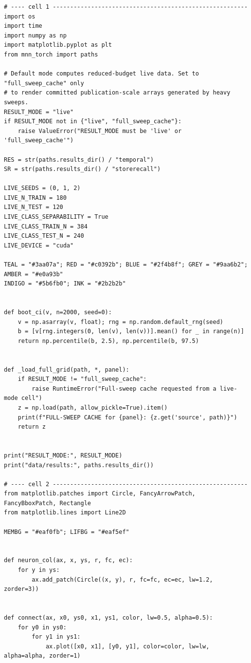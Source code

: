 \begin{lstlisting}[caption={experiments/temporal\_storerecall.ipynb},label={lst:mnn-nb-temporal-storerecall}]
# ---- cell 1 --------------------------------------------------------
import os
import time
import numpy as np
import matplotlib.pyplot as plt
from mnn_torch import paths

# Default mode computes reduced-budget live data. Set to "full_sweep_cache" only
# to render committed publication-scale arrays generated by heavy sweeps.
RESULT_MODE = "live"
if RESULT_MODE not in {"live", "full_sweep_cache"}:
    raise ValueError("RESULT_MODE must be 'live' or 'full_sweep_cache'")

RES = str(paths.results_dir() / "temporal")
SR = str(paths.results_dir() / "storerecall")

LIVE_SEEDS = (0, 1, 2)
LIVE_N_TRAIN = 180
LIVE_N_TEST = 120
LIVE_CLASS_SEPARABILITY = True
LIVE_CLASS_TRAIN_N = 384
LIVE_CLASS_TEST_N = 240
LIVE_DEVICE = "cuda"

TEAL = "#3aa07a"; RED = "#c0392b"; BLUE = "#2f4b8f"; GREY = "#9aa6b2"; AMBER = "#e0a93b"
INDIGO = "#5b6fb0"; INK = "#2b2b2b"


def boot_ci(v, n=2000, seed=0):
    v = np.asarray(v, float); rng = np.random.default_rng(seed)
    b = [v[rng.integers(0, len(v), len(v))].mean() for _ in range(n)]
    return np.percentile(b, 2.5), np.percentile(b, 97.5)


def _load_full_grid(path, *, panel):
    if RESULT_MODE != "full_sweep_cache":
        raise RuntimeError("Full-sweep cache requested from a live-mode cell")
    z = np.load(path, allow_pickle=True).item()
    print(f"FULL-SWEEP CACHE for {panel}: {z.get('source', path)}")
    return z


print("RESULT_MODE:", RESULT_MODE)
print("data/results:", paths.results_dir())

# ---- cell 2 --------------------------------------------------------
from matplotlib.patches import Circle, FancyArrowPatch, FancyBboxPatch, Rectangle
from matplotlib.lines import Line2D

MEMBG = "#eaf0fb"; LIFBG = "#eaf5ef"


def neuron_col(ax, x, ys, r, fc, ec):
    for y in ys:
        ax.add_patch(Circle((x, y), r, fc=fc, ec=ec, lw=1.2, zorder=3))


def connect(ax, x0, ys0, x1, ys1, color, lw=0.5, alpha=0.5):
    for y0 in ys0:
        for y1 in ys1:
            ax.plot([x0, x1], [y0, y1], color=color, lw=lw, alpha=alpha, zorder=1)



\end{lstlisting}
